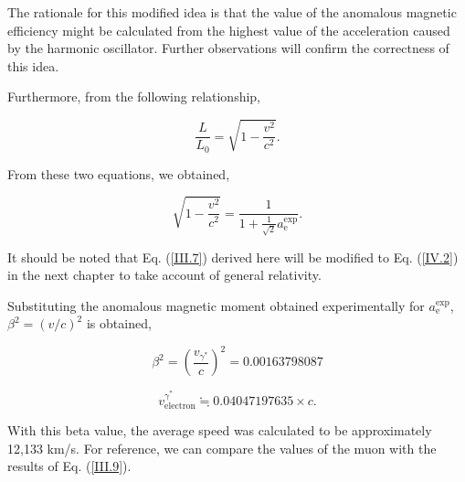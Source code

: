 \documentclass[%
 reprint,
 amsmath,amssymb,
 aps,
]{revtex4-1}
\numberwithin{equation}{section}%
\begin{document}

The rationale for this modified idea is that the value of the anomalous magnetic efficiency might be calculated from the highest value of the acceleration caused by the harmonic oscillator. Further observations will confirm the correctness of this idea.

Furthermore, from the following relationship,

    \begin{equation}
        \frac{L}{L_0} = \sqrt{1 - \frac{v^2}{c^2}} .
    \end{equation}

From these two equations, we obtained,

    \begin{equation}
        \sqrt{1 - \frac{v^2}{c^2}} = \frac{1}{1 + \frac{1}{\sqrt{2}} a^{\text{exp}}_{\text{e}}}  .
        \label{III.7}
    \end{equation}


It should be noted that Eq. (\ref{III.7}) derived here will be modified to Eq. (\ref{IV.2}) in the next chapter to take account of general relativity.


Substituting the anomalous magnetic moment obtained experimentally for $a^{\text{exp}}_{\text{e}}$, $\beta^2 = (v/{c})^2$ is obtained,


    \begin{equation}
        \beta^2 = (\frac{v_{\gamma^{*}}}{c})^2 = 0.00163798087
    \end{equation}

    \begin{equation}
        v_{\text{electron}}^{\gamma^{*}} \fallingdotseq 0.04047197635 \times c .
        \label{III.9}
    \end{equation}


With this beta value, the average speed was calculated to be approximately 12,133 km/s. For reference, we can compare the values of the muon with the results of Eq. (\ref{III.9}). 
\end{document}
